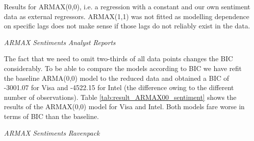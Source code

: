 \begin{table}[h!]
    \centering
    \vspace{-2ex}
    \small
    
    \vspace{1ex}
    
    \vspace{-2ex}
    \small
    
    \caption{Results for ARMAX(0,0), i.e. a regression with a constant and our own sentiment data as external regressors. ARMAX(1,1) was not fitted as modelling dependence on specific lags does not make sense if those lags do not reliably exist in the data.}
    \label{tab:result_ARMAX00_sentiment}
\end{table}{}

\textit{ARMAX Sentiments Analyst Reports}

The fact that we need to omit two-thirds of all data points changes the BIC considerably. To be able to compare the models according to BIC we have refit the baseline ARMA(0,0) model to the reduced data and obtained a BIC of -3001.07 for Visa and -4522.15 for Intel  (the difference owing to the different number of observations). Table \ref{tab:result_ARMAX00_sentiment} shows the results of the ARMAX(0,0) model for Visa and Intel. Both models fare worse in terms of BIC than the baseline. 

\textit{ARMAX Sentiments Ravenpack}


